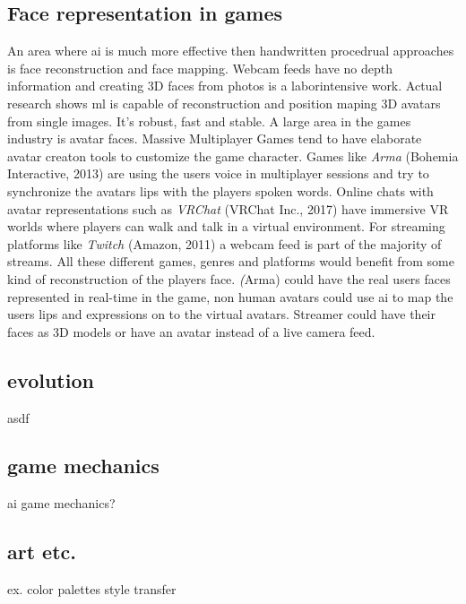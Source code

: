 \documentclass[10pt,a4paper]{article}
\begin{document}
\subsection{Face representation in games}
An area where \gls{ai} is much more effective then handwritten procedrual approaches is face reconstruction and face mapping. Webcam feeds have no depth information and creating 3D faces from photos is a laborintensive work. Actual research shows \gls{ml} is capable of reconstruction and position maping 3D avatars from single images. It's robust, fast and stable\cite{Feng2018}. A large area in the games industry is avatar faces. Massive Multiplayer Games tend to have elaborate avatar creaton tools to customize the game character. Games like \textit{Arma} (Bohemia Interactive, 2013) are using the users voice in multiplayer sessions and try to synchronize the avatars lips with the players spoken words. Online chats with avatar representations such as \textit{VRChat} (VRChat Inc., 2017) have immersive VR worlds where players can walk and talk in a virtual environment. For streaming platforms like \textit{Twitch} (Amazon, 2011) a webcam feed is part of the majority of streams. All these different games, genres and platforms would benefit from some kind of reconstruction of the players face. \textit(Arma) could have the real users faces represented in real-time in the game, non human avatars could use \gls{ai} to map the users lips and expressions on to the virtual avatars. Streamer could have their faces as 3D models or have an avatar instead of a live camera feed.

\subsection{evolution}
asdf

\subsection{game mechanics}
ai game mechanics?

\subsection{art etc.}
ex. color palettes
style transfer
\end{document}
